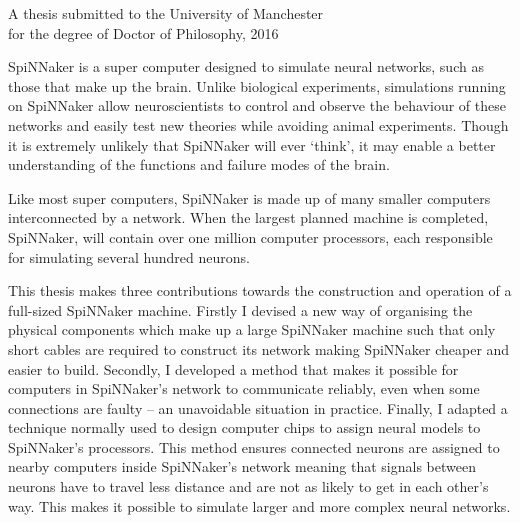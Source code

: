 {
	
	
	
	\vfill
	
	\begin{center}
		\textsc{\large\thesistitle}
		
		\vspace{0.5em}
		
		\thesisauthor
		
		\vspace{0.5em}
		
		A thesis submitted to the University of Manchester\\
		for the degree of Doctor of Philosophy, 2016
	\end{center}
	
	\vfill
	
	
	SpiNNaker is a super computer designed to simulate neural networks, such as
	those that make up the brain. Unlike biological experiments, simulations
	running on SpiNNaker allow neuroscientists to control and observe the
	behaviour of these networks and easily test new theories while avoiding
	animal experiments. Though it is extremely unlikely that SpiNNaker will ever
	`think', it may enable a better understanding of the functions and failure
	modes of the brain.
	
	Like most super computers, SpiNNaker is made up of many smaller computers
	interconnected by a network. When the largest planned machine is completed,
	SpiNNaker, will contain over one million computer processors, each
	responsible for simulating several hundred neurons.
	
	This thesis makes three contributions towards the construction and operation
	of a full-sized SpiNNaker machine. Firstly I devised a new way of organising
	the physical components which make up a large SpiNNaker machine such that
	only short cables are required to construct its network making SpiNNaker
	cheaper and easier to build. Secondly, I developed a method that makes it
	possible for computers in SpiNNaker's network to communicate reliably, even
	when some connections are faulty -- an unavoidable situation in practice.
	Finally, I adapted a technique normally used to design computer chips to
	assign neural models to SpiNNaker's processors. This method ensures connected
	neurons are assigned to nearby computers inside SpiNNaker's network meaning
	that signals between neurons have to travel less distance and are not as
	likely to get in each other's way. This makes it possible to simulate larger
	and more complex neural networks.
	
	\par%
}
